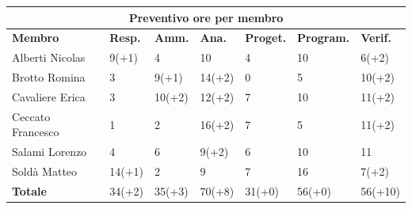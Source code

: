 \documentclass[a4paper, 12pt]{article}
\begin{document}
\begin{center}
	\begin{tabularx}{\textwidth}{|X|X|X|X|X|X|X|}
		\hline
		\multicolumn{7}{|c|}{\textbf{Preventivo ore per membro}}                                            \\
		\hline
		\hline
		\textbf{Membro}   & \textbf{Resp.}    & \textbf{Amm.}   & \textbf{Ana.} &
		\textbf{Proget.}  & \textbf{Program.} & \textbf{Verif.}                                             \\
		\hline
		Alberti Nicolas   & 9(+1)             & 4               & 10            & 4      & 10     & 6(+2)   \\
		\hline
		Brotto Romina     & 3                 & 9(+1)           & 14(+2)        & 0      & 5      & 10(+2)  \\
		\hline
		Cavaliere Erica   & 3                 & 10(+2)          & 12(+2)        & 7      & 10     & 11(+2)  \\
		\hline
		Ceccato Francesco & 1                 & 2               & 16(+2)        & 7      & 5      & 11(+2)  \\
		\hline
		Salami Lorenzo    & 4                 & 6               & 9(+2)         & 6      & 10     & 11      \\
		\hline
		Soldà Matteo      & 14(+1)            & 2               & 9             & 7      & 16     & 7(+2)   \\
		\hline
		\hline
		\textbf{Totale}   & 34(+2)            & 35(+3)          & 70(+8)        & 31(+0) & 56(+0) & 56(+10) \\
		\hline
	\end{tabularx}\\[8pt]
	\mbox{}\\
\end{center}

\newpage
\end{document}
